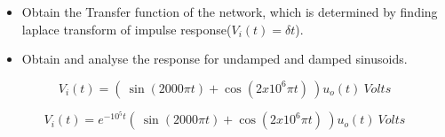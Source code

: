 \documentclass[11pt, a4paper]{article}
\begin{document}
\begin{itemize}
\item Obtain the Transfer function of the network, which is determined by
finding laplace transform of impulse response(\(V_{i}(t) = \delta t\)).
\end{itemize}


\begin{itemize}

\item
  Obtain and analyse the response for undamped and damped sinusoids.
\end{itemize}

\begin{equation}
V_{i}(t) = ( \ \sin(2000\pi t) + \cos(2x10^{6}\pi t) \ )u_{o}(t) \ Volts
\end{equation}

\begin{equation}
V_{i}(t) = e^{-10^{5}t}( \ \sin(2000\pi t) + \cos(2x10^{6}\pi t) \ )u_{o}(t) \ Volts
\end{equation}
\end{document}
